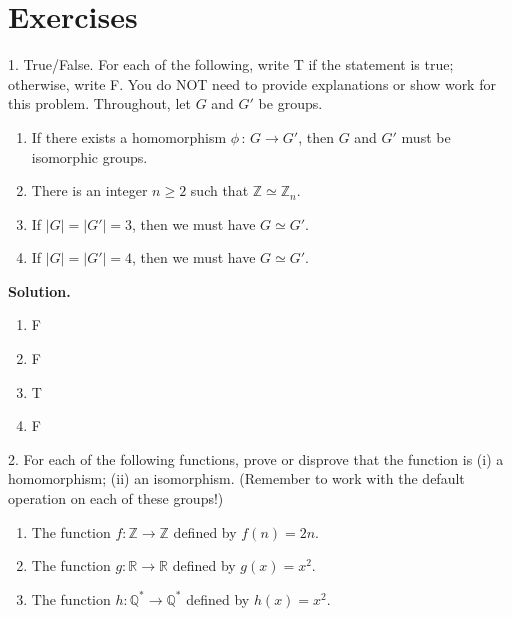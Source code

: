 \documentclass[10pt,]{book}
\theoremstyle{plain}
\theoremstyle{definition}
\theoremstyle{definition}
\theoremstyle{definition}
\theoremstyle{definition}
\numberwithin{equation}{section}
\def\Z{\mathbb{Z}}
\def\R{\mathbb{R}}
\def\Q{\mathbb{Q}}
\begin{document}
\section[{Exercises}]{Exercises}\label{exercises-4}
\begin{exerciselist}
\item[1.]\hypertarget{exercise-21}{}
        True/False. For each of the following, write T if the statement is
        true; otherwise, write F. You do NOT need to provide explanations or show work for this problem. Throughout, let \(G\) and \(G'\) be groups.
        \leavevmode%
\begin{enumerate}[label=(\alph*)]
\item\hypertarget{li-154}{}
              If there exists a homomorphism \(\phi\,:\,G\to G'\), then \(G\) and \(G'\) must be isomorphic groups.
\item\hypertarget{li-155}{}
              There is an integer \(n\geq 2\) such that \(\Z\simeq \Z_n\).
\item\hypertarget{li-156}{}
              If \(|G|=|G'|=3\), then we must have \(G\simeq G'\).
\item\hypertarget{li-157}{}
              If \(|G|=|G'|=4\), then we must have \(G\simeq G'\).
\end{enumerate}

\par\smallskip
\par\smallskip
\noindent\textbf{Solution.}\hypertarget{solution-21}{}\quad
\leavevmode%
\begin{multicols}{4}
\begin{enumerate}[label=(\alph*)]
\item\hypertarget{li-158}{}
          F
\item\hypertarget{li-159}{}
          F
\item\hypertarget{li-160}{}
          T
\item\hypertarget{li-161}{}
          F
\end{enumerate}
\end{multicols}
\item[2.]\hypertarget{exercise-22}{}
        For each of the following functions, prove or
        disprove that the function is (i) a homomorphism; (ii)
        an isomorphism. (Remember to work with the default operation on each of these groups!)
        \leavevmode%
\begin{enumerate}[label=(\alph*)]
\item\hypertarget{li-162}{}
              The function \(f:\Z\to\Z\) defined by \(f(n)=2n\).
\item\hypertarget{li-163}{}
              The function \(g:\R\to\R\) defined by \(g(x)=x^2\).
\item\hypertarget{li-164}{}
              The function \(h:\Q^*\to\Q^*\) defined by
              \(h(x)=x^2\).
\end{enumerate}


\end{exerciselist}
\end{document}
